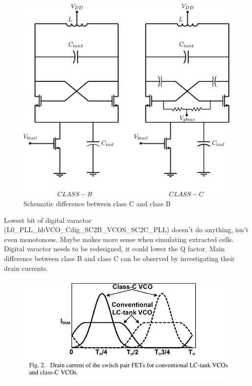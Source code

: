 \documentclass{article}
\begin{document}

\begin{figure}[ht!]
	\centering
	\includegraphics[width=0.7\linewidth]{Figures/class-B_vs_class-C.pdf}
	\caption{Schematic difference between class C and class B}
	\label{fig:classC_classB_inkscape}
\end{figure}


Lowest bit of digital varactor (L0\_PLL\_hbVCO\_Cdig\_SC2B\_VCOS\_SC2C\_PLL) doesn't do anything, isn't even monotonous. Maybe makes more sense when simulating extracted cells. Digital varactor needs to be redesigned, it could lower the Q factor.
Main difference between class B and class C can be observed by investigating their drain currents.

\begin{figure}[ht!]
	\includegraphics[width=\linewidth]{Figures/drainCurrent_classB_vs_classC.png}
	\label{fig:drainCurrent_classB_vs_classC}
\end{figure}
\end{document}
